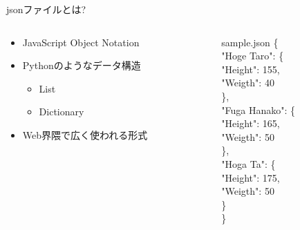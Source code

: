 \documentclass[12pt, dvipdfmx]{beamer}
\begin{document}
\begin{frame}{jsonファイルとは?}
    \begin{columns}[t]
        \begin{column}{0.6\textwidth}
            \begin{itemize}
                \item JavaScript Object Notation
                \item Pythonのようなデータ構造
                \begin{itemize}
                    \item List
                    \item Dictionary
                \end{itemize}
                \item Web界隈で広く使われる形式
            \end{itemize}
        \end{column}
        \begin{column}{0.4\textwidth}
            \begin{block}{sample.json}
            {\tiny
            \{\\
            \hspace{4em}    "Hoge Taro": \{\\
            \hspace{8em}        "Height": 155,\\
            \hspace{8em}        "Weigth": 40\\
            \hspace{4em}    \},\\
            \hspace{4em}    "Fuga Hanako": \{\\
            \hspace{8em}        "Height": 165,\\
            \hspace{8em}        "Weigth": 50\\
            \hspace{4em}    \},\\
            \hspace{4em}    "Hoga Ta": \{\\
            \hspace{8em}        "Height": 175,\\
            \hspace{8em}        "Weigth": 50\\
            \hspace{4em}    \}\\
            \}\\
            }
            \end{block}
        \end{column}
    \end{columns}
\end{frame}
\end{document}

